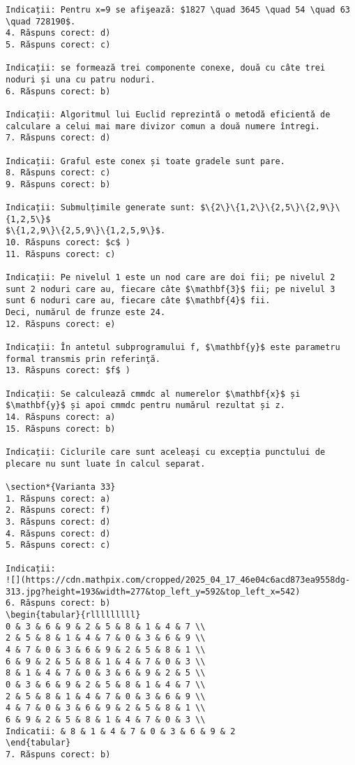 \begin{verbatim}
Indicații: Pentru x=9 se afişează: $1827 \quad 3645 \quad 54 \quad 63 \quad 728190$.
4. Răspuns corect: d)
5. Răspuns corect: c)

Indicații: se formează trei componente conexe, două cu câte trei noduri și una cu patru noduri.
6. Răspuns corect: b)

Indicații: Algoritmul lui Euclid reprezintă o metodă eficientă de calculare a celui mai mare divizor comun a două numere întregi.
7. Răspuns corect: d)

Indicații: Graful este conex și toate gradele sunt pare.
8. Răspuns corect: c)
9. Răspuns corect: b)

Indicații: Submulțimile generate sunt: $\{2\}\{1,2\}\{2,5\}\{2,9\}\{1,2,5\}$
$\{1,2,9\}\{2,5,9\}\{1,2,5,9\}$.
10. Răspuns corect: $c$ )
11. Răspuns corect: c)

Indicații: Pe nivelul 1 este un nod care are doi fii; pe nivelul 2 sunt 2 noduri care au, fiecare câte $\mathbf{3}$ fii; pe nivelul 3 sunt 6 noduri care au, fiecare câte $\mathbf{4}$ fii.
Deci, numărul de frunze este 24.
12. Răspuns corect: e)

Indicații: În antetul subprogramului f, $\mathbf{y}$ este parametru formal transmis prin referinţă.
13. Răspuns corect: $f$ )

Indicații: Se calculează cmmdc al numerelor $\mathbf{x}$ și $\mathbf{y}$ și apoi cmmdc pentru numărul rezultat și z.
14. Răspuns corect: a)
15. Răspuns corect: b)

Indicații: Ciclurile care sunt aceleași cu excepția punctului de plecare nu sunt luate în calcul separat.

\section*{Varianta 33}
1. Răspuns corect: a)
2. Răspuns corect: f)
3. Răspuns corect: d)
4. Răspuns corect: d)
5. Răspuns corect: c)

Indicații:
![](https://cdn.mathpix.com/cropped/2025_04_17_46e04c6acd873ea9558dg-313.jpg?height=193&width=277&top_left_y=592&top_left_x=542)
6. Răspuns corect: b)
\begin{tabular}{rlllllllll}
0 & 3 & 6 & 9 & 2 & 5 & 8 & 1 & 4 & 7 \\
2 & 5 & 8 & 1 & 4 & 7 & 0 & 3 & 6 & 9 \\
4 & 7 & 0 & 3 & 6 & 9 & 2 & 5 & 8 & 1 \\
6 & 9 & 2 & 5 & 8 & 1 & 4 & 7 & 0 & 3 \\
8 & 1 & 4 & 7 & 0 & 3 & 6 & 9 & 2 & 5 \\
0 & 3 & 6 & 9 & 2 & 5 & 8 & 1 & 4 & 7 \\
2 & 5 & 8 & 1 & 4 & 7 & 0 & 3 & 6 & 9 \\
4 & 7 & 0 & 3 & 6 & 9 & 2 & 5 & 8 & 1 \\
6 & 9 & 2 & 5 & 8 & 1 & 4 & 7 & 0 & 3 \\
Indicatii: & 8 & 1 & 4 & 7 & 0 & 3 & 6 & 9 & 2
\end{tabular}
7. Răspuns corect: b)


\end{verbatim}
